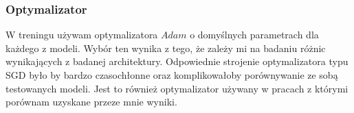 \subsubsection{Optymalizator}
W treningu używam optymalizatora \begin{math}Adam\end{math} o domyślnych parametrach dla każdego z modeli.
Wybór ten wynika z tego, że zależy mi na badaniu różnic wynikających z badanej architektury. Odpowiednie strojenie optymalizatora typu SGD
było by bardzo czasochłonne oraz komplikowałoby porównywanie ze sobą testowanych modeli. Jest to również optymalizator używany w pracach 
z którymi porównam uzyskane przeze mnie wyniki.  

